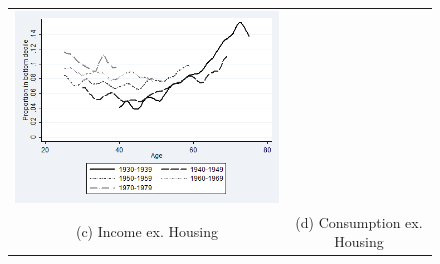 \begin{figure}
\begin{tabular}{c c}
\includegraphics[width=.5\linewidth]{pictures/cohortagerisksmooth_ahc_con.png} \\
(c) Income ex. Housing & (d) Consumption ex. Housing \\
\end{tabular}
\label{fig:povage_cohort}
\end{figure}


